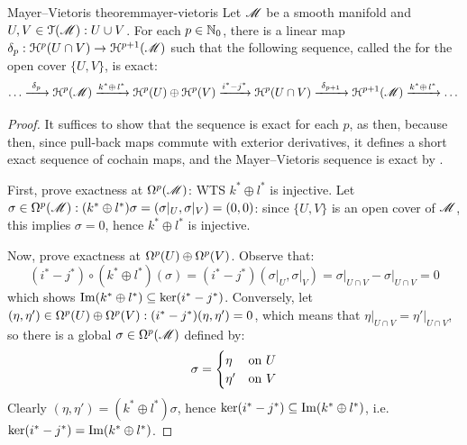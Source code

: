 \begin{theorem}{Mayer--Vietoris theorem}{mayer-vietoris}
  Let $ \mathscr{M} $ be a smooth manifold and $ U,V \in \EuScript{T}(\mathscr{M}) : U \cup V $. For each $ p \in \mathbb{N}_0 $, there is a linear map $ \delta_p : \EuScript{H}^{p}(U \cap V) \rightarrow \EuScript{H}^{p+1}(\mathscr{M}) $ such that the following sequence, called the  for the open cover $ \{U,V\} $, is exact:
  \begin{equation*}
    \dots \xrightarrow{\ \delta_p \ } \EuScript{H}^{p}(\mathscr{M}) \xrightarrow{k^* \oplus \, l^*} \EuScript{H}^{p}(U) \oplus \EuScript{H}^{p}(V) \xrightarrow{i^* - j^*} \EuScript{H}^{p}(U \cap V) \xrightarrow{\ \delta_{p+1} \ } \EuScript{H}^{p+1}(\mathscr{M}) \xrightarrow{k^* \oplus \, l^*} \dots
  \end{equation*}
\end{theorem}

\begin{proofbox}
  \begin{proof}
    It suffices to show that the sequence  is exact for each $ p $, as then, because then, since pull-back maps commute with exterior derivatives, it defines a short exact sequence of cochain maps, and the Mayer--Vietoris sequence is exact by .

    First, prove exactness at $ \Omega^{p}(\mathscr{M}) $: WTS $ k^* \oplus l^* $ is injective. Let $ \sigma \in \Omega^{p}(\mathscr{M}) : (k^* \oplus l^*) \sigma = (\sigma \vert_U , \sigma \vert_V) = (0,0) $: since $ \{U,V\} $ is an open cover of $ \mathscr{M} $, this implies $ \sigma = 0 $, hence $ k^* \oplus l^* $ is injective.

    Now, prove exactness at $ \Omega^{p}(U) \oplus \Omega^{p}(V) $. Observe that:
    \begin{equation*}
      (i^* - j^*) \circ (k^* \oplus l^*) (\sigma) = (i^* - j^*) (\sigma \vert_U , \sigma \vert_V)  = \sigma \vert_{U \cap V} - \sigma \vert_{U \cap V} = 0
    \end{equation*}
    which shows $ \operatorname{Im}(k^* \oplus l^*) \subseteq \ker (i^* - j^*) $. Conversely, let $ (\eta , \eta') \in \Omega^{p}(U) \oplus \Omega^{p}(V) : (i^* - j^*)(\eta , \eta') = 0 $, which means that $ \eta \vert_{U \cap V} = \eta' \vert_{U \cap V} $, so there is a global $ \sigma \in \Omega^{p}(\mathscr{M}) $ defined by:
    \begin{equation*}
      \sigma =
      \begin{cases}
        \eta & \text{on $ U $} \\
        \eta' & \text{on $ V $}
      \end{cases}
    \end{equation*}
    Clearly $ (\eta , \eta') = (k^* \oplus l^*) \sigma $, hence $ \ker(i^* - j^*) \subseteq \operatorname{Im}(k^* \oplus l^*) $, i.e. $ \ker(i^* - j^*) = \operatorname{Im}(k^* \oplus l^*) $.


\end{proof}
\end{proofbox}
